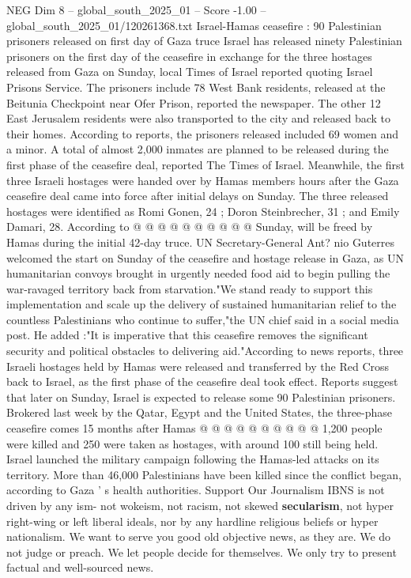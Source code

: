 \begin{textsample}{NEG Dim 8 – global\_south\_2025\_01 – Score -1.00 – global\_south\_2025\_01/120261368.txt}  \label{ex:f8_neg_136}
Israel-Hamas ceasefire : 90 Palestinian prisoners released on first day of Gaza truce Israel has released ninety Palestinian prisoners on the first day of the ceasefire in exchange for the three hostages released from Gaza on Sunday, local Times of Israel reported quoting Israel Prisons Service.
The prisoners include 78 West Bank residents, released at the Beitunia Checkpoint near Ofer Prison, reported the newspaper.
The other 12 East Jerusalem residents were also transported to the city and released back to their homes.
According to reports, the prisoners released included 69 women and a minor.
A total of almost 2,000 inmates are planned to be released during the first phase of the ceasefire deal, reported The Times of Israel.
Meanwhile, the first three Israeli hostages were handed over by Hamas members hours after the Gaza ceasefire deal came into force after initial delays on Sunday.
The three released hostages were identified as Romi Gonen, 24 ; Doron Steinbrecher, 31 ; and Emily Damari, 28.
According to @ @ @ @ @ @ @ @ @ @ Sunday, will be freed by Hamas during the initial 42-day truce.
UN Secretary-General Ant? nio Guterres welcomed the start on Sunday of the ceasefire and hostage release in Gaza, as UN humanitarian convoys brought in urgently needed food aid to begin pulling the war-ravaged territory back from starvation."We stand ready to support this implementation and scale up the delivery of sustained humanitarian relief to the countless Palestinians who continue to suffer,"the UN chief said in a social media post.
He added :"It is imperative that this ceasefire removes the significant security and political obstacles to delivering aid."According to news reports, three Israeli hostages held by Hamas were released and transferred by the Red Cross back to Israel, as the first phase of the ceasefire deal took effect.
Reports suggest that later on Sunday, Israel is expected to release some 90 Palestinian prisoners.
Brokered last week by the Qatar, Egypt and the United States, the three-phase ceasefire comes 15 months after Hamas @ @ @ @ @ @ @ @ @ @ 1,200 people were killed and 250 were taken as hostages, with around 100 still being held.
Israel launched the military campaign following the Hamas-led attacks on its territory.
More than 46,000 Palestinians have been killed since the conflict began, according to Gaza ' s health authorities.
Support Our Journalism IBNS is not driven by any ism- not wokeism, not racism, not skewed \textbf{secularism}, not hyper right-wing or left liberal ideals, nor by any hardline religious beliefs or hyper nationalism.
We want to serve you good old objective news, as they are.
We do not judge or preach.
We let people decide for themselves.
We only try to present factual and well-sourced news.

\end{textsample}
